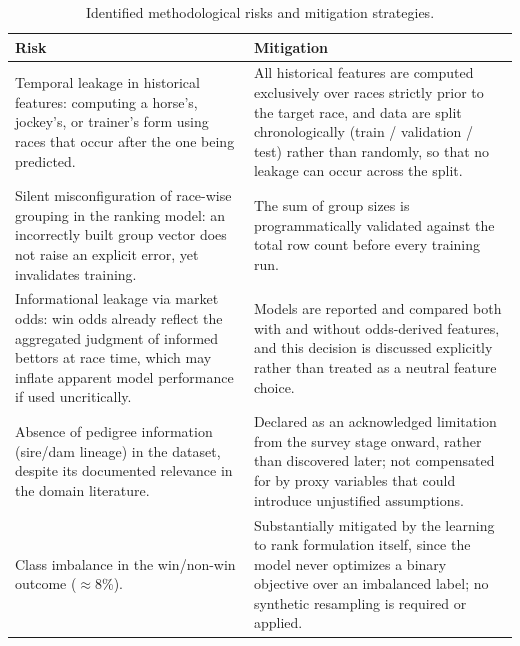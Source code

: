 \begin{table}[h]
\centering
\caption{Identified methodological risks and mitigation strategies.}
\label{tab:risks}
\begin{tabular}{|p{3.6cm}|p{4.2cm}|}
\hline
\textbf{Risk} & \textbf{Mitigation} \\
\hline
Temporal leakage in historical features: computing a horse's, jockey's, or trainer's form using races that occur after the one being predicted. &
All historical features are computed exclusively over races strictly prior to the target race, and data are split chronologically (train / validation / test) rather than randomly, so that no leakage can occur across the split. \\
\hline
Silent misconfiguration of race-wise grouping in the ranking model: an incorrectly built group vector does not raise an explicit error, yet invalidates training. &
The sum of group sizes is programmatically validated against the total row count before every training run. \\
\hline
Informational leakage via market odds: win odds already reflect the aggregated judgment of informed bettors at race time, which may inflate apparent model performance if used uncritically. &
Models are reported and compared both with and without odds-derived features, and this decision is discussed explicitly rather than treated as a neutral feature choice. \\
\hline
Absence of pedigree information (sire/dam lineage) in the dataset, despite its documented relevance in the domain literature. &
Declared as an acknowledged limitation from the survey stage onward, rather than discovered later; not compensated for by proxy variables that could introduce unjustified assumptions. \\
\hline
Class imbalance in the win/non-win outcome ($\approx$8\%). &
Substantially mitigated by the learning to rank formulation itself, since the model never optimizes a binary objective over an imbalanced label; no synthetic resampling is required or applied. \\
\hline
\end{tabular}
\end{table}
